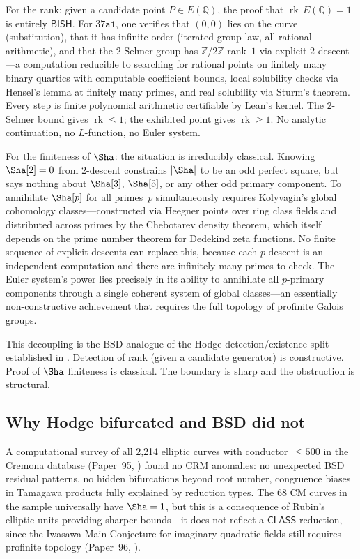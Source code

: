 \documentclass[11pt]{article}
\DeclareMathOperator{\rk}{rk}
\theoremstyle{plain}
\theoremstyle{definition}
\theoremstyle{remark}
\newcommand{\ZZ}{\mathbb{Z}}
\newcommand{\QQ}{\mathbb{Q}}
\newcommand{\BISH}{\mathsf{BISH}}
\newcommand{\CLASS}{\mathsf{CLASS}}
\begin{document}
For the rank: given a candidate point $P \in E(\QQ)$, the proof
that $\rk\, E(\QQ) = 1$ is entirely $\BISH$.  For $37\texttt{a1}$,
one verifies that $(0,0)$ lies on the curve (substitution), that
it has infinite order (iterated group law, all rational arithmetic),
and that the $2$-Selmer group has $\ZZ/2\ZZ$-rank~$1$ via explicit
$2$-descent---a computation reducible to searching for rational
points on finitely many binary quartics with computable coefficient
bounds, local solubility checks via Hensel's lemma at finitely many
primes, and real solubility via Sturm's theorem.  Every step is
finite polynomial arithmetic certifiable by Lean's kernel.  The
$2$-Selmer bound gives $\rk \leq 1$; the exhibited point gives
$\rk \geq 1$.  No analytic continuation, no $L$-function, no
Euler system.

For the finiteness of
$\Sha$: the situation is
irreducibly classical.  Knowing
$\Sha[2] = 0$ from $2$-descent
constrains
$|\Sha|$ to be an odd perfect
square, but says nothing about
$\Sha[3]$,
$\Sha[5]$, or any other odd
primary component.  To annihilate
$\Sha[p]$ for all primes~$p$
simultaneously requires Kolyvagin's global cohomology classes---constructed
via Heegner points over ring class fields and distributed across primes
by the Chebotarev density theorem, which itself depends on the prime
number theorem for Dedekind zeta functions.  No finite sequence of
explicit descents can replace this, because each $p$-descent is an
independent computation and there are infinitely many primes to check.
The Euler system's power lies precisely in its ability to annihilate
all $p$-primary components through a single coherent system of global
classes---an essentially non-constructive achievement that requires the
full topology of profinite Galois groups.

This decoupling is the BSD analogue of the Hodge detection/existence
split established in .  Detection of rank (given
a candidate generator) is constructive.  Proof of
$\Sha$ finiteness is classical.
The boundary is sharp and the obstruction is structural.

\subsection{Why Hodge bifurcated and BSD did not}

A computational survey of all 2{,}214 elliptic curves with
conductor~$\leq 500$ in the Cremona database (Paper~95, \cite{p95})
found no CRM anomalies: no unexpected BSD residual patterns, no
hidden bifurcations beyond root number, congruence biases in
Tamagawa products fully explained by reduction types.  The 68 CM
curves in the sample universally have
$\Sha = 1$, but this is a
consequence of Rubin's elliptic units providing sharper bounds---it
does not reflect a $\CLASS$ reduction, since the Iwasawa Main
Conjecture for imaginary quadratic fields still requires profinite
topology (Paper~96, \cite{p96}).
\end{document}
